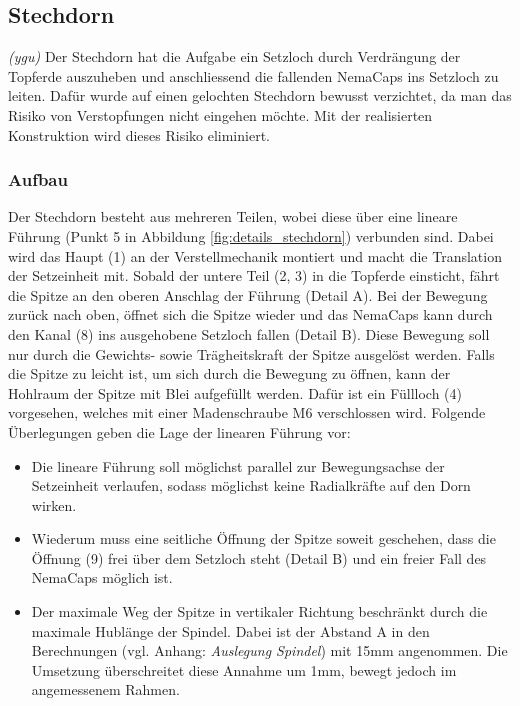 \subsection{Stechdorn}
\textit{(ygu)} Der Stechdorn hat die Aufgabe ein Setzloch durch Verdrängung der Topferde auszuheben und anschliessend die fallenden NemaCaps ins Setzloch zu leiten. Dafür wurde auf einen gelochten Stechdorn bewusst verzichtet, da man das Risiko von Verstopfungen nicht eingehen möchte. Mit der realisierten Konstruktion wird dieses Risiko eliminiert. 
\newline

\subsubsection{Aufbau}
Der Stechdorn besteht aus mehreren Teilen, wobei diese über eine lineare Führung (Punkt 5 in Abbildung \ref{fig:details_stechdorn}) verbunden sind. Dabei wird das Haupt (1) an der Verstellmechanik montiert und macht die Translation der Setzeinheit mit. Sobald der untere Teil (2, 3) in die Topferde einsticht, fährt die Spitze an den oberen Anschlag der Führung (Detail A). Bei der Bewegung zurück nach oben, öffnet sich die Spitze wieder und das NemaCaps kann durch den Kanal (8) ins ausgehobene Setzloch fallen (Detail B). Diese Bewegung soll nur durch die Gewichts- sowie Trägheitskraft der Spitze ausgelöst werden. Falls die Spitze zu leicht ist, um sich durch die Bewegung zu öffnen, kann der Hohlraum der Spitze mit Blei aufgefüllt werden. Dafür ist ein Füllloch (4) vorgesehen, welches mit einer Madenschraube M6 verschlossen wird. Folgende Überlegungen geben die Lage der linearen Führung vor:
\begin{itemize}
	\item Die lineare Führung soll möglichst parallel zur Bewegungsachse der Setzeinheit verlaufen, sodass möglichst keine Radialkräfte auf den Dorn wirken.
	
	\item Wiederum muss eine seitliche Öffnung der Spitze soweit geschehen, dass die Öffnung (9) frei über dem Setzloch steht (Detail B) und ein freier Fall des NemaCaps möglich ist.
	
	\item Der maximale Weg der Spitze in vertikaler Richtung beschränkt durch die maximale Hublänge der Spindel. Dabei ist der Abstand A in den Berechnungen (vgl. Anhang: \textit{Auslegung Spindel}) mit 15mm angenommen. Die Umsetzung überschreitet diese Annahme um 1mm, bewegt jedoch im angemessenem Rahmen.
\end{itemize}

